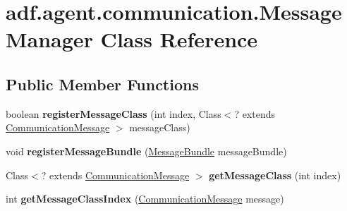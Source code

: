 \hypertarget{classadf_1_1agent_1_1communication_1_1MessageManager}{}\section{adf.\+agent.\+communication.\+Message\+Manager Class Reference}
\label{classadf_1_1agent_1_1communication_1_1MessageManager}
\subsection*{Public Member Functions}
\begin{DoxyCompactItemize}
\item 
\hypertarget{classadf_1_1agent_1_1communication_1_1MessageManager_a0f995e8c0da19177190b54e75e50b2ae}{}\label{classadf_1_1agent_1_1communication_1_1MessageManager_a0f995e8c0da19177190b54e75e50b2ae} 
boolean {\bfseries register\+Message\+Class} (int index, Class$<$? extends \hyperlink{classadf_1_1component_1_1communication_1_1CommunicationMessage}{Communication\+Message} $>$ message\+Class)
\item 
\hypertarget{classadf_1_1agent_1_1communication_1_1MessageManager_a6b634d9bdafbcbed7c6c85cde84c09c9}{}\label{classadf_1_1agent_1_1communication_1_1MessageManager_a6b634d9bdafbcbed7c6c85cde84c09c9} 
void {\bfseries register\+Message\+Bundle} (\hyperlink{classadf_1_1component_1_1communication_1_1MessageBundle}{Message\+Bundle} message\+Bundle)
\item 
\hypertarget{classadf_1_1agent_1_1communication_1_1MessageManager_aea47acc4d752be5b0d00669800741801}{}\label{classadf_1_1agent_1_1communication_1_1MessageManager_aea47acc4d752be5b0d00669800741801} 
Class$<$? extends \hyperlink{classadf_1_1component_1_1communication_1_1CommunicationMessage}{Communication\+Message} $>$ {\bfseries get\+Message\+Class} (int index)
\item 
\hypertarget{classadf_1_1agent_1_1communication_1_1MessageManager_a97cd96aafacd7f00d62aabc4c0c831ab}{}\label{classadf_1_1agent_1_1communication_1_1MessageManager_a97cd96aafacd7f00d62aabc4c0c831ab} 
int {\bfseries get\+Message\+Class\+Index} (\hyperlink{classadf_1_1component_1_1communication_1_1CommunicationMessage}{Communication\+Message} message)
\item 
\hypertarget{classadf_1_1agent_1_1communication_1_1MessageManager_a09975b03dd75277e8052b48f68bdec0e}{}\label{classadf_1_1agent_1_1communication_1_1MessageManager_a09975b03dd75277e8052b48f68bdec0e} 

\end{DoxyCompactItemize}
